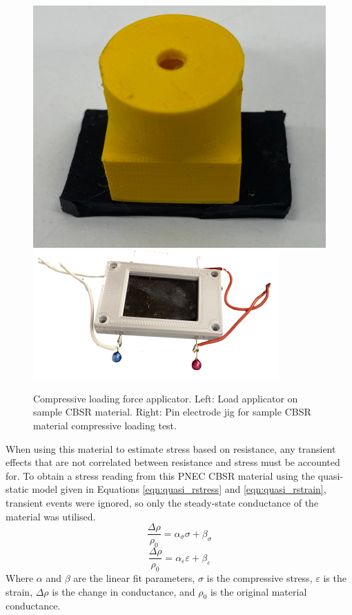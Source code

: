 \begin{figure}[H]
	\centering
	\includegraphics[width=0.25\linewidth]{Figures/QS_load_applicator.png}
	\includegraphics[width=0.4\linewidth]{Figures/QS_load_applicator_w_pins.png}
	\caption{Compressive loading force applicator. Left: Load applicator on sample CBSR material. Right: Pin electrode jig for sample CBSR material compressive loading test.}
	\label{fig:compressive_CBSR_load}
\end{figure}  

When using this material to estimate stress based on resistance, any transient effects that are not correlated between resistance and stress must be accounted for. To obtain a stress reading from this PNEC CBSR material using the quasi-static model given in Equations \ref{eqn:quasi_rstress} and \ref{eqn:quasi_rstrain}, transient events were ignored, so only the steady-state conductance of the material was utilised. 
\begin{equation}
    \frac{\Delta \rho}{\rho_0} = \alpha_\sigma \sigma + \beta_\sigma
    \label{eqn:quasi_rstress}
\end{equation}
\begin{equation}
    \frac{\Delta \rho}{\rho_0} = \alpha_\varepsilon \varepsilon + \beta_\varepsilon
    \label{eqn:quasi_rstrain}
\end{equation}
Where $\alpha$ and $\beta$ are the linear fit parameters, $\sigma$ is the compressive stress, $\varepsilon$ is the strain, $\Delta \rho$ is the change in conductance, and $\rho_0$ is the original material conductance.

